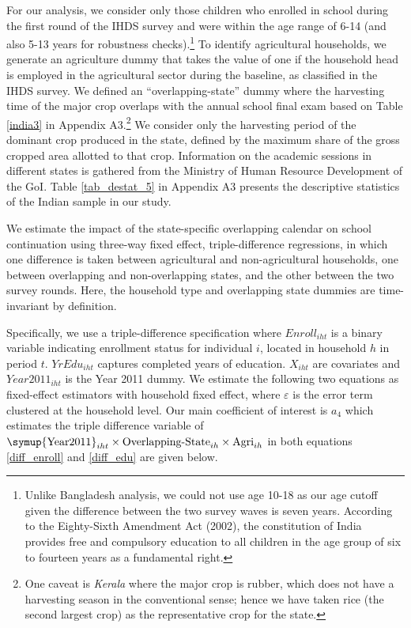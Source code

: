 \documentclass[12pt,letterpaper]{article}
\newcommand{\0}{\ensuremath{\mbox{\boldmath $0$}}}
\begin{document}
For our analysis, we consider only those children who enrolled in school during the first round of the IHDS survey and were within the age range of 6-14 (and also 5-13 years for robustness checks).\footnote{Unlike Bangladesh analysis, we could not use age 10-18 as our age cutoff given the difference between the two survey waves is seven years. According to the Eighty-Sixth Amendment Act (2002), the constitution of India provides free and compulsory education to all children in the age group of six to fourteen years as a fundamental right. } To identify agricultural households, we generate an agriculture dummy that takes the value of one if the household head is employed in the agricultural sector during the baseline, as classified in the IHDS survey.  We defined an ``overlapping-state'' dummy where the harvesting time of the major crop overlaps with the annual school final exam based on Table \ref{india3} in Appendix A3.\footnote{One caveat is \textit{Kerala} where the major crop is rubber, which does not have a harvesting season in the conventional sense; hence we have taken rice (the second largest crop) as the representative crop for the state. } We consider only the harvesting period of the dominant crop produced in the state, defined by the maximum share of the gross cropped area allotted to that crop. Information on the academic sessions in different states is gathered from the Ministry of Human Resource Development of the GoI. Table \ref{tab_destat_5} in Appendix A3 presents the descriptive statistics of the Indian sample in our study.

We estimate the impact of the state-specific overlapping calendar on school continuation using three-way fixed effect, triple-difference regressions, in which one difference is taken between agricultural and non-agricultural households, one between overlapping and non-overlapping states, and the other between the two survey rounds. Here, the household type and overlapping state dummies are time-invariant by definition.

Specifically, we use a triple-difference specification where ${Enroll}_{iht}$ is a binary variable indicating enrollment status for individual $i$, located in household $h$ in period $t$. ${YrEdu}_{iht}$ captures completed years of education. ${X}_{iht}$ are covariates and ${Year2011}_{iht}$ is the Year 2011 dummy. We estimate the following two equations as fixed-effect estimators with household fixed effect, where $\varepsilon$ is the error term clustered at the household level. Our main coefficient of interest is $a_4$ which estimates the triple difference variable of $\textnormal\symup{Year2011}_{iht}\times \textnormal{Overlapping-State}_{ih}\times\textnormal{Agri}_{ih}$ in both equations \ref{diff_enroll} and \ref{diff_edu} are given below.
\end{document}
